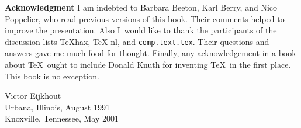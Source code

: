 \documentclass[twoside,letterpaper,openright]{rapport3}
\begin{document}
\medskip\noindent
{\bf Acknowledgment}\nl
I am indebted to Barbara Beeton, Karl Berry, and Nico Poppelier,
who read previous versions of this book. Their comments
helped to improve the presentation.
Also I~would like to thank the participants of
the discussion lists \TeX hax, \TeX-nl, and {\tt comp.text.tex}.
Their questions and answers gave me much food for thought.
Finally, any acknowledgement in a book about \TeX\ ought to
include Donald Knuth for inventing \TeX\ in the
first place. This book is no exception.

\begin{flushright}
 Victor Eijkhout\\
 Urbana, Illinois, August 1991\\
 Knoxville, Tennessee, May 2001
\end{flushright}
\pagebreak
\normalheads
\end{document}

